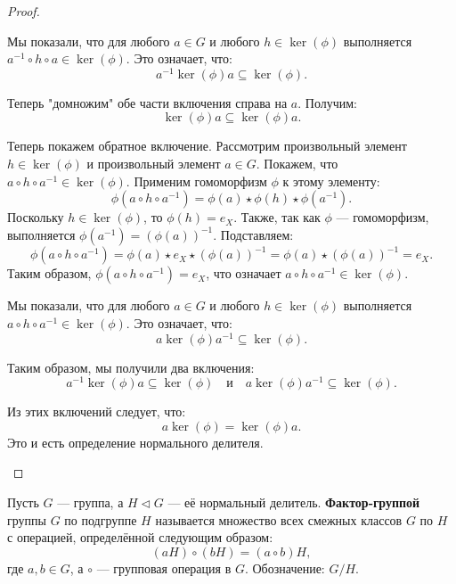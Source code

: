 \begin{proof}
\begin{enumerate}
              Мы показали, что для любого \( a \in G \) и любого \( h \in \ker(\phi) \) выполняется \( a^{-1} \circ h \circ a \in \ker(\phi) \). Это означает, что:
              \[
              a^{-1} \ker(\phi) a \subseteq \ker(\phi).
              \]

              Теперь "домножим" обе части включения справа на \( a \). Получим:
              \[
              \ker(\phi) a \subseteq \ker(\phi) a.
              \]
              

              Теперь покажем обратное включение. Рассмотрим произвольный элемент \( h \in \ker(\phi) \) и произвольный элемент \( a \in G \). Покажем, что \( a \circ h \circ a^{-1} \in \ker(\phi) \). Применим гомоморфизм \( \phi \) к этому элементу:
              \[
              \phi(a \circ h \circ a^{-1}) = \phi(a) \star \phi(h) \star \phi(a^{-1}).
              \]
              Поскольку \( h \in \ker(\phi) \), то \( \phi(h) = e_X \). Также, так как \( \phi \) — гомоморфизм, выполняется \( \phi(a^{-1}) = (\phi(a))^{-1} \). Подставляем:
              \[
              \phi(a \circ h \circ a^{-1}) = \phi(a) \star e_X \star (\phi(a))^{-1} = \phi(a) \star (\phi(a))^{-1} = e_X.
              \]
              Таким образом, \( \phi(a \circ h \circ a^{-1}) = e_X \), что означает \( a \circ h \circ a^{-1} \in \ker(\phi) \).

              Мы показали, что для любого \( a \in G \) и любого \( h \in \ker(\phi) \) выполняется \( a \circ h \circ a^{-1} \in \ker(\phi) \). Это означает, что:
              \[
              a \ker(\phi) a^{-1} \subseteq \ker(\phi).
              \]

              Таким образом, мы получили два включения:
              \[
              a^{-1} \ker(\phi) a \subseteq \ker(\phi) \quad \text{и} \quad a \ker(\phi) a^{-1} \subseteq \ker(\phi).
              \]
              
              Из этих включений следует, что:
              \[
              a \ker(\phi) = \ker(\phi) a.
              \]
              Это и есть определение нормального делителя.
    \end{enumerate}
\end{proof}

\clearpage

\begin{shdef}
    \begin{definition}
    \leavevmode \nl 
    
        Пусть \( G \) — группа, а \( H \triangleleft G \) — её нормальный делитель. \textbf{Фактор-группой} группы \( G \) по подгруппе \( H \) называется множество всех смежных классов \( G \) по \( H \) с операцией, определённой следующим образом:
        \[
        (aH) \circ (bH) = (a \circ b)H,
        \]
        где \( a, b \in G \), а \( \circ \) — групповая операция в \( G \). Обозначение: \( G / H \).
    \end{definition}
\end{shdef}


